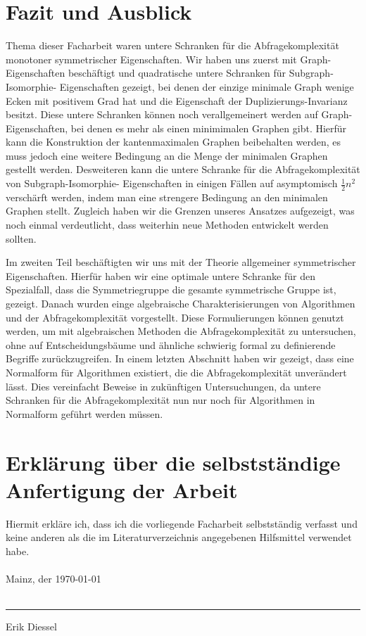 \documentclass[10pt,a4paper, footheight=1mm]{scrreprt}
\theoremstyle{definition}
\begin{document}
\vspace*{1cm}

\begingroup
\let\clearpage\relax
\chapter{Fazit und Ausblick}
\endgroup
Thema dieser Facharbeit waren untere Schranken für die
Abfragekomplexität monotoner symmetrischer Eigenschaften.
Wir haben uns zuerst mit Graph-Eigenschaften beschäftigt 
und quadratische untere Schranken für Subgraph-Isomorphie-
Eigenschaften gezeigt, bei denen der einzige minimale
Graph wenige Ecken mit positivem Grad hat und die
Eigenschaft der Duplizierungs-Invarianz besitzt.
Diese untere Schranken können noch verallgemeinert werden
auf Graph-Eigenschaften, bei denen es mehr als einen
minimimalen Graphen gibt. Hierfür kann die Konstruktion
der kantenmaximalen Graphen beibehalten werden, es muss
jedoch eine weitere Bedingung an die Menge der minimalen
Graphen gestellt werden. Desweiteren kann die untere
Schranke für die Abfragekomplexität von Subgraph-Isomorphie-
Eigenschaften in einigen Fällen auf asymptomisch $\frac{1}{2}n^2$
verschärft werden, indem man eine strengere Bedingung
an den minimalen Graphen stellt.
Zugleich haben wir die Grenzen unseres Ansatzes
aufgezeigt, was noch einmal verdeutlicht, dass 
weiterhin neue Methoden entwickelt werden sollten.

Im zweiten Teil beschäftigten wir uns mit der
Theorie allgemeiner symmetrischer Eigenschaften.
Hierfür haben wir eine optimale untere Schranke für
den Spezialfall, dass die Symmetriegruppe die gesamte
symmetrische Gruppe ist, gezeigt. Danach wurden
einge algebraische Charakterisierungen von Algorithmen
und der Abfragekomplexität vorgestellt. Diese Formulierungen
können genutzt werden, um mit algebraischen Methoden
die Abfragekomplexität zu untersuchen, ohne auf 
Entscheidungsbäume und ähnliche schwierig formal zu 
definierende Begriffe zurückzugreifen. In einem letzten
Abschnitt haben wir gezeigt, dass eine Normalform
für Algorithmen existiert, die die Abfragekomplexität
unverändert lässt. Dies vereinfacht Beweise
in zukünftigen Untersuchungen, da untere Schranken
für die Abfragekomplexität nun nur noch für Algorithmen
in Normalform geführt werden müssen.

\printbibliography[title={\ Literatur}]

\chapter*{Erklärung über die selbstständige Anfertigung der Arbeit}

Hiermit erkläre ich, dass ich die vorliegende Facharbeit
selbstständig verfasst und keine anderen als die im Literaturverzeichnis
angegebenen Hilfsmittel verwendet habe. \\ \\

Mainz, der \today \\ \\

\rule{7cm}{0.4mm}
\vspace*{0.2cm}

Erik Diessel
\end{document}
